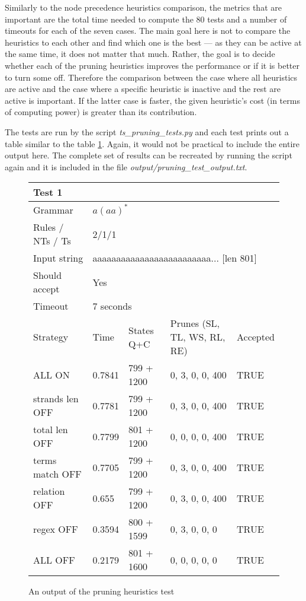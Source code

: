 Similarly to the node precedence heuristics comparison, the metrics that are important are the total time needed to compute the 80 tests and a number of timeouts for each of the seven cases. The main goal here is not to compare the heuristics to each other and find which one is the best --- as they can be active at the same time, it does not matter that much. Rather, the goal is to decide whether each of the pruning heuristics improves the performance or if it is better to turn some off. Therefore the comparison between the case where all heuristics are active and the case where a specific heuristic is inactive and the rest are active is important. If the latter case is faster, the given heuristic's cost (in terms of computing power) is greater than its contribution.

The tests are run by the script \textit{ts\_pruning\_tests.py} and each test prints out a table similar to the table \ref{tab:prune_heuristics_table}. Again, it would not be practical to include the entire output here. The complete set of results can be recreated by running the script again and it is included in the file \textit{output/pruning\_test\_output.txt}.

\begin{figure}[h!]
  \caption{An output of the pruning heuristics test}
  \label{tab:prune_heuristics_table}
\begin{tabular}{ |l|l|l|l|l|  }
  \hline
  \multicolumn{5}{|l|}{Test 1} \\
  \hline
  Grammar & \multicolumn{4}{|l|}{$a(aa)^*$} \\
  Rules / NTs / Ts & \multicolumn{4}{|l|}{2/1/1} \\
  Input string & \multicolumn{4}{|l|}{aaaaaaaaaaaaaaaaaaaaaaaaa... [len 801]} \\
  Should accept & \multicolumn{4}{|l|}{Yes} \\
  Timeout & \multicolumn{4}{|l|}{7 seconds} \\
  \hline
  Strategy & Time & States Q+C & Prunes (SL, TL, WS, RL, RE)& Accepted \\
  \hline
  ALL ON & 0.7841 & 799 + 1200 & 0, 3, 0, 0, 400 & TRUE \\
  strands len OFF & 0.7781 & 799 + 1200 & 0, 3, 0, 0, 400 & TRUE \\
  total len OFF & 0.7799 & 801 + 1200 & 0, 0, 0, 0, 400 & TRUE \\
  terms match OFF & 0.7705 & 799 + 1200 & 0, 3, 0, 0, 400 & TRUE \\
  relation OFF & 0.655 & 799 + 1200 & 0, 3, 0, 0, 400 & TRUE \\
  regex OFF & 0.3594 & 800 + 1599 & 0, 3, 0, 0, 0 & TRUE \\
  ALL OFF & 0.2179 & 801 + 1600 & 0, 0, 0, 0, 0 & TRUE \\
  \hline
\end{tabular}
\end{figure}

